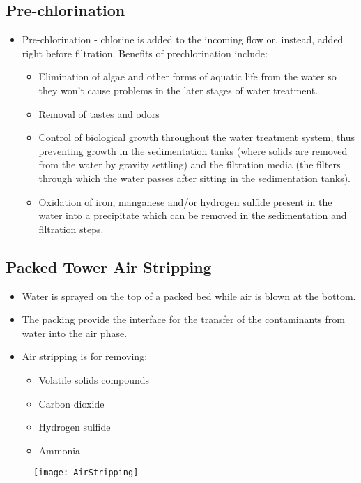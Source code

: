 \subsection{Pre-chlorination}
\begin{itemize}
\item Pre-chlorination - chlorine is added to the incoming flow or, instead, added right before filtration.  Benefits of prechlorination include:
\begin{itemize}
\item Elimination of algae and other forms of aquatic life from the water so they won’t cause problems in the later stages of water treatment. 
\item Removal of tastes and odors
\item Control of biological growth throughout the water treatment system, thus preventing growth in the sedimentation tanks (where solids are removed from the water by gravity settling) and the filtration media (the filters through which the water passes after sitting in the sedimentation tanks). 
\item Oxidation of iron, manganese and/or hydrogen sulfide present in the water into a precipitate which can be removed in the sedimentation and filtration steps.
\end{itemize}
\end{itemize}

\subsection{Packed Tower Air Stripping}
\begin{itemize}
\item Water is sprayed on the top of a packed bed while air is blown at the bottom.
\item The packing provide the interface for the transfer of the contaminants from water into the air phase.
\item Air stripping is for removing:
\begin{itemize}
\item Volatile solids compounds
\item Carbon dioxide
\item Hydrogen sulfide
\item Ammonia
\end{itemize}
\end{itemize}
\begin{figure}[h]
\begin{center}
\texttt{[image: AirStripping]}\\
\end{center}
\end{figure}

